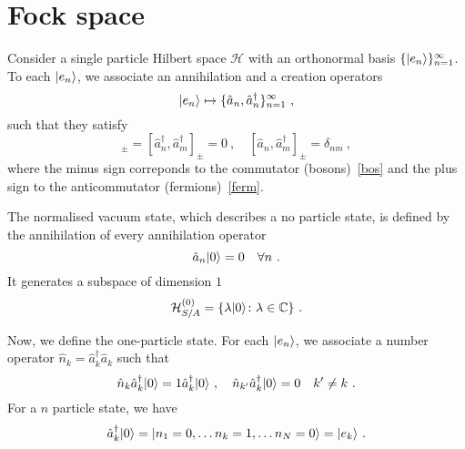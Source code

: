 \section{Fock space}

    Consider a single particle Hilbert space $\mathcal H$ with an orthonormal basis $\{\vert e_n\rangle\}_{n=1}^\infty$. To each $\vert e_n\rangle$, we associate an annihilation and a creation operators 
    \begin{equation*}
        \vert e_n\rangle \mapsto \{\hat a_n, \hat a_n^\dagger \}_{n=1}^\infty ~,
    \end{equation*}
    such that they satisfy
    \begin{equation*}
        [\hat a_n, \hat a_m]_\pm = [\hat a_n^\dagger, \hat a_m^\dagger]_\pm = 0 ~, \quad [\hat a_n, \hat a_m^\dagger]_\pm = \delta_{nm} ~,
    \end{equation*}
    where the minus sign correponds to the commutator (bosons)~\eqref{bos} and the plus sign to the anticommutator (fermions)~\eqref{ferm}. 

    The normalised vacuum state, which describes a no particle state, is defined by the annihilation of every annihilation operator
    \begin{equation*}
        \hat a_n \vert0\rangle = 0 \quad \forall n~.
    \end{equation*}
    It generates a subspace of dimension $1$ 
    \begin{equation}\label{vac}
        \mathcal H^{(0)}_{S/A} = \{\lambda \vert0\rangle \colon \lambda \in \mathbb C \} ~.
    \end{equation}

    Now, we define the one-particle state. For each $\vert e_n\rangle$, we associate a number operator $\hat n_k = \hat a_k^\dagger \hat a_k$ such that 
    \begin{equation*}
        \hat n_k \hat a_k^\dagger \vert0\rangle = 1 \hat a_k^\dagger \vert0\rangle ~, \quad \hat n_{k'} \hat a_k^\dagger \vert0\rangle = 0 \quad k' \neq k ~.
    \end{equation*}
    For a $n$ particle state, we have 
    \begin{equation*}
        \hat a_k^\dagger \vert0\rangle = \vert n_1=0, \ldots n_k=1, \ldots n_N=0\rangle = \vert e_k\rangle ~.
    \end{equation*}

